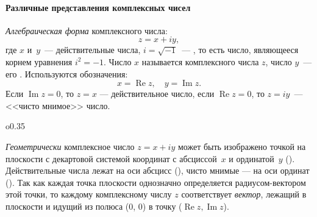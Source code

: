 \begin{labsupplement}

\renewcommand{\Re}{\mathop{\mathrm{Re}}}
\renewcommand{\Im}{\mathop{\mathrm{Im}}}

%

\paragraph{Различные представления комплексных чисел}
    \emph{Алгебраическая форма} комплексного числа:
    \begin{equation*}
        z = x + iy,
    \end{equation*}
где $x$ и~$y$~--- действительные числа, $i = \sqrt{- 1}$~--- ,
то есть число, являющееся корнем уравнения $i^2 = -1$.
Число $x$ называется  комплексного числа $z$,
число $y$~--- его . Используются обозначения:
    \begin{equation*}
        x = \Re z,\quad y = \Im z.
    \end{equation*}
Если $\Im z = 0$, то $z = x$ --- действительное число, если
    $\Re z = 0$, то $z = iy$~--- <<чисто мнимое>> число.

    \begin{wrapfigure}{o}{0.35\textwidth}
    \end{wrapfigure}

    \emph{Геометрически} комплексное число $z=x+iy$ может быть изображено точкой
    на плоскости с декартовой системой координат с абсциссой~$x$ и ординатой~$y$
    ().
    Действительные числа лежат на оси абсцисс (),
    чисто мнимые --- на оси ординат ().
    Так как каждая точка плоскости однозначно определяется радиусом-вектором этой точки,
    то каждому комплексному числу $z$ соответствует \emph{вектор},
    лежащий в плоскости и идущий из полюса (0, 0) в точку ($\Re{z},\Im{z}$).


\end{labsupplement}
